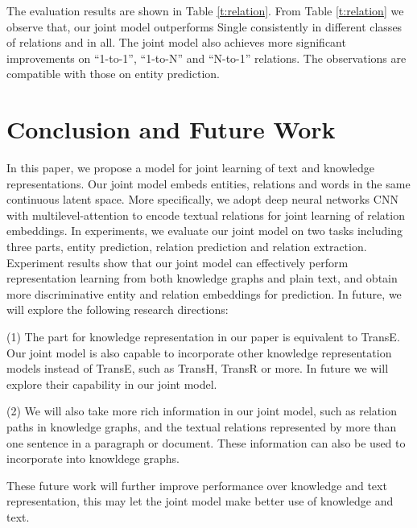 \documentclass[11pt,a4paper]{article}
\begin{document}
The evaluation results are shown in Table \ref{t:relation}. From Table \ref{t:relation} we observe that, our joint model outperforms Single consistently in different classes of relations and in all. The joint model also achieves more significant improvements on ``1-to-1'', ``1-to-N'' and ``N-to-1'' relations. The observations are compatible with those on entity prediction.


\section{Conclusion and Future Work}

In this paper, we propose a model for joint learning of text and knowledge representations. Our joint model embeds entities, relations and words in the same continuous latent space. More specifically, we adopt deep neural networks CNN with multilevel-attention to encode textual relations for joint learning of relation embeddings. In experiments, we evaluate our joint model on two tasks including three parts, entity prediction, relation prediction and relation extraction. Experiment results show that our joint model can effectively perform representation learning from both knowledge graphs and plain text, and obtain more discriminative entity and relation embeddings for prediction. In future, we will explore the following research directions: 

(1) The part for knowledge representation in our paper is equivalent to TransE. Our joint model is also capable to incorporate other knowledge representation models instead of TransE, such as TransH, TransR or more. In future we will explore their capability in our joint model. 

(2) We will also take more rich information in our joint model, such as relation paths in knowledge graphs, and the textual relations represented by more than one sentence in a paragraph or document. These information can also be used to incorporate into knowldege graphs.

These future work will further improve performance over knowledge and text representation, this may let the joint model make better use of knowledge and text.



\end{document}
